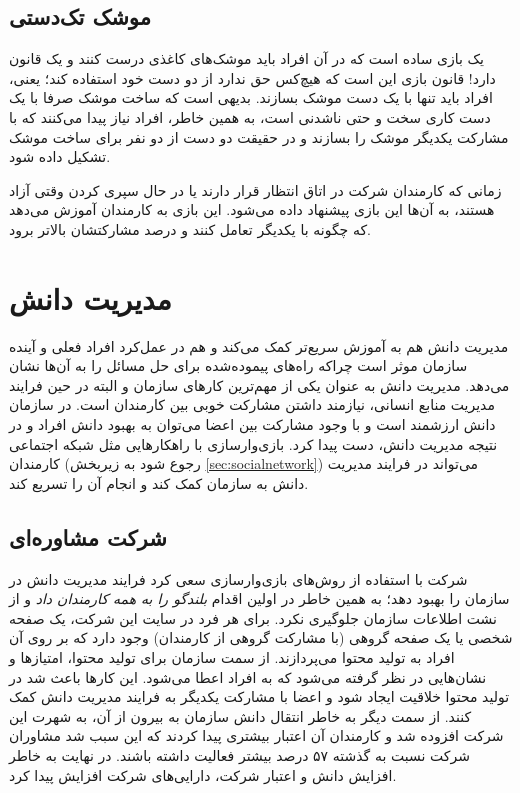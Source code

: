 \subsection{موشک تک‌دستی}
یک بازی ساده است که در آن افراد باید موشک‌های کاغذی درست کنند و یک قانون دارد! قانون بازی این است که هیچ‌کس حق ندارد از دو دست خود استفاده کند؛ یعنی، افراد باید تنها با یک دست موشک بسازند. بدیهی است که ساخت موشک صرفا با یک دست کاری سخت و حتی ناشدنی است، به همین خاطر، افراد نیاز پیدا می‌کنند که با مشارکت یکدیگر موشک را بسازند و در حقیقت دو دست از دو نفر برای ساخت موشک تشکیل داده شود.

زمانی که کارمندان شرکت در اتاق انتظار قرار دارند یا در حال سپری کردن وقتی آزاد هستند، به آن‌ها این بازی پیشنهاد داده می‌شود. این بازی به کارمندان آموزش می‌دهد که چگونه با یکدیگر تعامل کنند و درصد مشارکتشان بالاتر برود.
\section{مدیریت دانش}
مدیریت دانش هم به آموزش سریع‌تر کمک می‌کند و هم در عمل‌کرد افراد فعلی و آینده سازمان موثر است چراکه راه‌های پیموده‌شده برای حل مسائل را به آن‌ها نشان می‌دهد. مدیریت دانش به عنوان یکی از مهم‌ترین کارهای سازمان و البته در حین فرایند مدیریت منابع انسانی، نیازمند داشتن مشارکت خوبی بین کارمندان است. در سازمان دانش ارزشمند است و با وجود مشارکت بین اعضا می‌توان به بهبود دانش افراد و در نتیجه مدیریت دانش، دست پیدا کرد. بازی‌وارسازی با راهکارهایی مثل شبکه اجتماعی کارمندان (رجوع شود به زیربخش \ref{sec:socialnetwork}) می‌تواند در فرایند مدیریت دانش به سازمان کمک کند و انجام آن را تسریع کند.
\subsection{شرکت مشاوره‌ای }
شرکت  با استفاده از روش‌های بازی‌وارسازی سعی کرد فرایند مدیریت دانش در سازمان را بهبود دهد؛ به همین خاطر در اولین اقدام \emph{بلندگو را به همه کارمندان داد} و از نشت اطلاعات سازمان جلوگیری نکرد. برای هر فرد در سایت این شرکت، یک صفحه شخصی یا یک صفحه گروهی (با مشارکت گروهی از کارمندان) وجود دارد که بر روی آن افراد به تولید محتوا می‌پردازند. از سمت سازمان برای تولید محتوا، امتیازها و نشان‌هایی در نظر گرفته می‌شود که به افراد اعطا می‌شود. این کارها باعث شد در تولید محتوا خلاقیت ایجاد شود و اعضا با مشارکت یکدیگر به فرایند مدیریت دانش کمک کنند. از سمت دیگر به خاطر انتقال دانش سازمان به بیرون از آن، به شهرت این شرکت افزوده شد و کارمندان آن اعتبار بیشتری پیدا کردند که این سبب شد مشاوران شرکت نسبت به گذشته ۵۷ درصد بیشتر فعالیت داشته باشند. در نهایت به خاطر افزایش دانش و اعتبار شرکت، دارایی‌های شرکت افزایش پیدا کرد.

